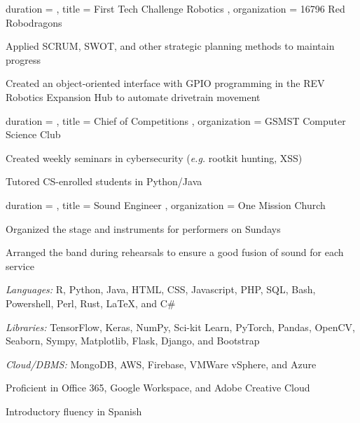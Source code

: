\documentclass[sidebar-width=2.25in, primary=slate]{clean-resume}
\begin{document}
\begin{main}
    \begin{experience}
      {
        duration = {  },
        title = { First Tech Challenge Robotics },
        organization = { 16796 Red Robodragons }
      }
      \item Applied SCRUM, SWOT, and other strategic planning methods to maintain progress
      \item Created an object-oriented interface with GPIO programming in the REV Robotics Expansion Hub to automate drivetrain movement
    \end{experience}

    \begin{experience}
      {
        duration = {  },
        title = { Chief of Competitions },
        organization = { GSMST Computer Science Club }
      }
      \item Created weekly seminars in cybersecurity (\emph{e.g.} rootkit hunting, XSS)
      \item Tutored CS-enrolled students in Python/Java
    \end{experience}

    \begin{experience}
      {
        duration = {  },
        title = { Sound Engineer },
        organization = { One Mission Church }
      }
      \item Organized the stage and instruments for performers on Sundays
      \item Arranged the band during rehearsals to ensure a good fusion of sound for each service
    \end{experience}

    \begin{lst}
      \item \emph{Languages:} R, Python, Java, HTML, CSS, Javascript, PHP, SQL, Bash, Powershell, Perl, Rust, \LaTeX, and C\#
      \item \emph{Libraries:} TensorFlow, Keras, NumPy, Sci-kit Learn, PyTorch, Pandas, OpenCV, Seaborn, Sympy, Matplotlib, Flask, Django, and Bootstrap
      \item \emph{Cloud/DBMS:} MongoDB, AWS, Firebase, VMWare vSphere, and Azure
      \item Proficient in Office 365, Google Workspace, and Adobe Creative Cloud
      \item Introductory fluency in Spanish
    \end{lst}
  \end{main}
\end{document}
